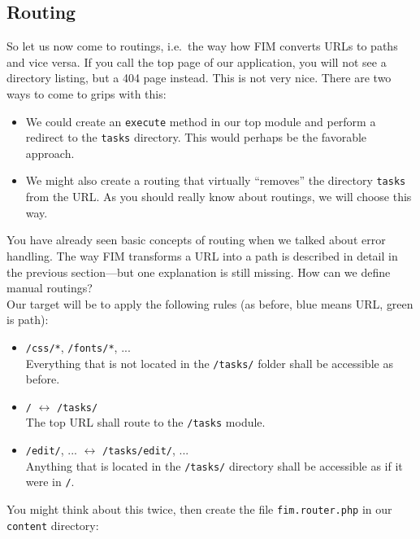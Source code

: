 \documentclass{scrartcl}
\begin{document}
   \subsection{Routing} \label{routing}
      So let us now come to routings, i.e.\ the way how FIM converts URLs to paths and vice versa. If you call the top page of our application, you will not see a directory listing, but a 404 page instead. This is not very nice. There are two ways to come to grips with this:
      \begin{itemize}
         \item
            We could create an \lstinline!execute! method in our top module and perform a redirect to the \texttt{tasks} directory. This would perhaps be the favorable approach.
         \item
            We might also create a routing that virtually ``removes'' the directory \texttt{tasks} from the URL. As you should really know about routings, we will choose this way.
      \end{itemize}
      You have already seen basic concepts of routing when we talked about error handling. The way FIM transforms a URL into a path is described in detail in the previous section---but one explanation is still missing. How can we define manual routings? \\
      Our target will be to apply the following rules (as before, {\color{nbBlue}blue} means URL, {\color{nbGreen}green} is path):
      \begin{itemize}
         \item {\color{nbBlue}\texttt{/css/*}}, {\color{nbBlue}\texttt{/fonts/*}}, ... \\
            Everything that is not located in the {\color{nbGreen}\texttt{/tasks/}} folder shall be accessible as before.
         \item {\color{nbBlue}\texttt{/}} $\leftrightarrow$ {\color{nbGreen}\texttt{/tasks/}} \\
            The top URL shall route to the {\color{nbGreen}\texttt{/tasks}} module.
         \item {\color{nbBlue}\texttt{/edit/}}, ... $\leftrightarrow$ {\color{nbGreen}\texttt{/tasks/edit/}}, ... \\
            Anything that is located in the {\color{nbGreen}\texttt{/tasks/}} directory shall be accessible as if it were in {\color{nbGreen}\texttt{/}}.
      \end{itemize}
      You might think about this twice, then create the file \texttt{fim.router.php} in our \texttt{content} directory: \thispagestyle{empty}\enlargethispage{2cm}
\end{document}
